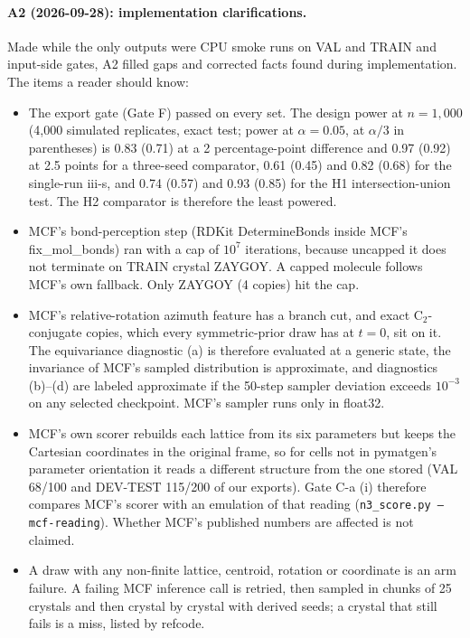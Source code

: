 \paragraph{A2 (2026-09-28): implementation clarifications.} Made while the only
outputs were CPU smoke runs on VAL and TRAIN and input-side gates, A2 filled gaps
and corrected facts found during implementation. The items a reader should know:
\begin{itemize}
\item The export gate (Gate F) passed on every set. The design power at
$n=1{,}000$ (4,000 simulated replicates, exact test; power at $\alpha=0.05$, at
$\alpha/3$ in parentheses) is 0.83 (0.71) at a 2 percentage-point difference and
0.97 (0.92) at 2.5 points for a three-seed comparator, 0.61 (0.45) and 0.82 (0.68)
for the single-run iii-s, and 0.74 (0.57) and 0.93 (0.85) for the H1
intersection-union test. The H2 comparator is therefore the least powered.
\item MCF's bond-perception step (RDKit\cite{landrum2026rdkit} DetermineBonds inside MCF's
fix\_mol\_bonds) ran with a cap of $10^7$ iterations, because uncapped it does not
terminate on TRAIN crystal ZAYGOY. A capped molecule follows MCF's own fallback.
Only ZAYGOY (4 copies) hit the cap.
\item MCF's relative-rotation azimuth feature has a branch cut, and exact
C$_2$-conjugate copies, which every symmetric-prior draw has at $t=0$, sit on it.
The equivariance diagnostic (a) is therefore evaluated at a generic state, the
invariance of MCF's sampled distribution is approximate, and diagnostics (b)--(d)
are labeled approximate if the 50-step sampler deviation exceeds $10^{-3}$ on any
selected checkpoint. MCF's sampler runs only in float32.
\item MCF's own scorer rebuilds each lattice from its six parameters but keeps the
Cartesian coordinates in the original frame, so for cells not in pymatgen's
parameter orientation it reads a different structure from the one stored (VAL
68/100 and DEV-TEST 115/200 of our exports). Gate C-a (i) therefore compares MCF's
scorer with an emulation of that reading (\texttt{n3\_score.py --mcf-reading}).
Whether MCF's published numbers are affected is not claimed.
\item A draw with any non-finite lattice, centroid, rotation or coordinate is an
arm failure. A failing MCF inference call is retried, then sampled in chunks
of 25 crystals and then crystal by crystal with derived seeds; a crystal that
still fails is a miss, listed by refcode.

\end{itemize}
